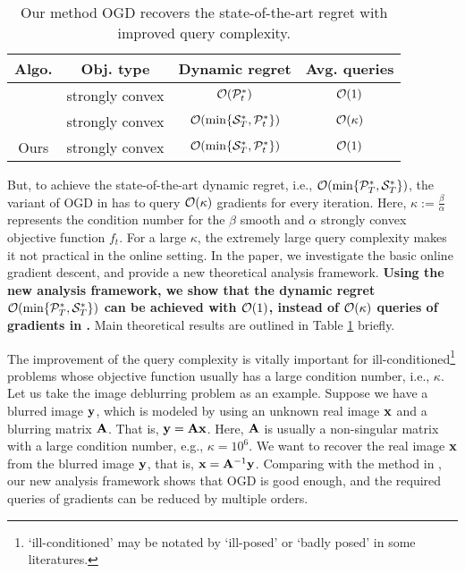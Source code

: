 \documentclass[journal]{IEEEtran}
\begin{document}
\begin{table}
\centering
\caption{ Our method OGD recovers the state-of-the-art regret with improved query complexity.   }
\begin{tabular}{c|c|c|c}
\hline 
Algo. & Obj.  type  & Dynamic regret & Avg. queries\tabularnewline
\hline
\hline 
\cite{Mokhtari:2016jz} & strongly convex  & ${\mathcal{O}}({\mathcal{P}}_t^{\ast})$ & ${\mathcal{O}}(1)$\tabularnewline \hline
\cite{Zhang:2016wl} & strongly convex  & ${\mathcal{O}}( \min\{{\mathcal{S}}_T^{\ast}, {\mathcal{P}}_t^{\ast}\} )$ & ${\mathcal{O}}(\kappa)$\tabularnewline
\hline 
Ours & strongly convex  & ${\mathcal{O}}( \min\{{\mathcal{S}}_T^{\ast}, {\mathcal{P}}_t^{\ast}\} )$  & ${\mathcal{O}}(1)$\tabularnewline
\hline 
\end{tabular}
\label{table_dynamic_regret}
\end{table}

But, to achieve the state-of-the-art dynamic regret, i.e., ${\mathcal{O}}(\min\{{\mathcal{P}}_T^{\ast}, {\mathcal{S}}_T^{\ast}\})$, the variant of OGD in \cite{Zhang:2016wl} has to query  ${\mathcal{O}}(\kappa)$ gradients for every iteration. Here, $\kappa := \frac{\beta}{\alpha}$ represents the condition number for the $\beta$ smooth and $\alpha$ strongly convex objective function $f_t$. For a large $\kappa$, the extremely large query complexity makes it not practical in the online setting. In the paper, we investigate the basic online gradient descent, and provide a new theoretical analysis framework. \textbf{Using the new analysis framework, we show that the dynamic regret ${\mathcal{O}}(\min\{{\mathcal{P}}_T^{\ast}, {\mathcal{S}}_T^{\ast}\})$ can be achieved with ${\mathcal{O}}(1)$, instead of  ${\mathcal{O}}(\kappa)$ queries of gradients in \cite{Zhang:2016wl}.}  Main theoretical results are outlined in Table \ref{table_dynamic_regret} briefly.  

The improvement of the query complexity is vitally important for ill-conditioned\footnote{`ill-conditioned' may be notated by `ill-posed' or `badly posed' in some literatures.} problems \cite{Tarantola:2004:IPT} whose objective function usually has a large condition number, i.e., $\kappa$. Let us take the image deblurring problem as an example.  Suppose we have a blurred image ${\bf y}$, which is modeled by using an unknown real image ${\bf x}$ and a blurring matrix ${\bf A}$. That is, ${\bf y} = {\bf A} {\bf x}$. Here, ${\bf A}$ is usually a non-singular matrix with a large condition number, e.g., $\kappa = 10^6$. We want to recover the real image ${\bf x}$ from the blurred image ${\bf y}$, that is, ${\bf x} = {\bf A}^{-1}{\bf y}$. Comparing with the method in \cite{Zhang:2016wl}, our new analysis framework shows that OGD is good enough, and the required queries of gradients can be reduced by multiple orders.     
\end{document}
